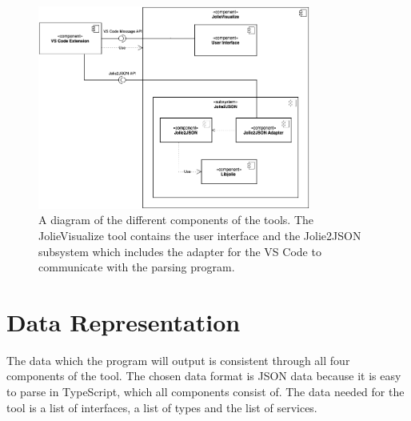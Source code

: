 \begin{figure}[t]
    \center
    \includegraphics[width=0.80\textwidth]{figures/component_diagram.png}
    \caption{A diagram of the different components of the tools. The JolieVisualize tool contains the user interface and the Jolie2JSON subsystem which includes the adapter for the VS Code to communicate with the parsing program.}
    \label{figure:comp_diagram}
\end{figure}

\section{Data Representation}
The data which the \javatoolname[] program will output is consistent through all
four components of the tool. The chosen data format is JSON data because it is easy to parse in TypeScript, which all components consist of.
The data needed for the tool is a list of interfaces, a list of types and the list of services.

